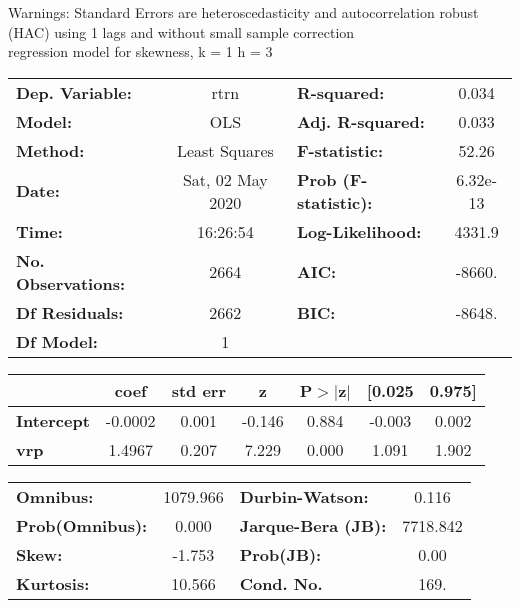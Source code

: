Warnings: \newline
 [1] Standard Errors are heteroscedasticity and autocorrelation robust (HAC) using 1 lags and without small sample correction\\ 

regression model for skewness, k = 1 h = 3\begin{center}
\begin{tabular}{lclc}
\toprule
\textbf{Dep. Variable:}    &       rtrn       & \textbf{  R-squared:         } &     0.034   \\
\textbf{Model:}            &       OLS        & \textbf{  Adj. R-squared:    } &     0.033   \\
\textbf{Method:}           &  Least Squares   & \textbf{  F-statistic:       } &     52.26   \\
\textbf{Date:}             & Sat, 02 May 2020 & \textbf{  Prob (F-statistic):} &  6.32e-13   \\
\textbf{Time:}             &     16:26:54     & \textbf{  Log-Likelihood:    } &    4331.9   \\
\textbf{No. Observations:} &        2664      & \textbf{  AIC:               } &    -8660.   \\
\textbf{Df Residuals:}     &        2662      & \textbf{  BIC:               } &    -8648.   \\
\textbf{Df Model:}         &           1      & \textbf{                     } &             \\
\bottomrule
\end{tabular}
\begin{tabular}{lcccccc}
                   & \textbf{coef} & \textbf{std err} & \textbf{z} & \textbf{P$> |$z$|$} & \textbf{[0.025} & \textbf{0.975]}  \\
\midrule
\textbf{Intercept} &      -0.0002  &        0.001     &    -0.146  &         0.884        &       -0.003    &        0.002     \\
\textbf{vrp}       &       1.4967  &        0.207     &     7.229  &         0.000        &        1.091    &        1.902     \\
\bottomrule
\end{tabular}
\begin{tabular}{lclc}
\textbf{Omnibus:}       & 1079.966 & \textbf{  Durbin-Watson:     } &    0.116  \\
\textbf{Prob(Omnibus):} &   0.000  & \textbf{  Jarque-Bera (JB):  } & 7718.842  \\
\textbf{Skew:}          &  -1.753  & \textbf{  Prob(JB):          } &     0.00  \\
\textbf{Kurtosis:}      &  10.566  & \textbf{  Cond. No.          } &     169.  \\
\bottomrule
\end{tabular}
\end{center}

